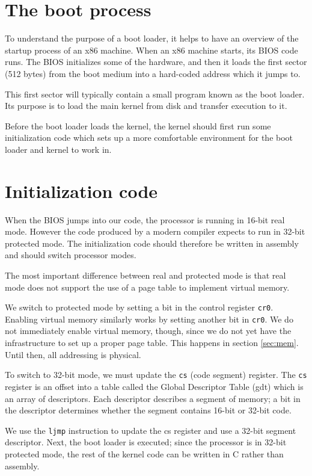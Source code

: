 \documentclass{report}
\begin{document}
\section{The boot process}
To understand the purpose of a boot loader, it helps to have an overview of
the startup process of an x86 machine.
When an x86 machine starts, its BIOS code runs. The BIOS initializes some of
the hardware, and then it loads the first sector (512 bytes) from the boot
medium into a hard-coded address which it jumps to.

This first sector will typically contain a small program known as the boot
loader. Its purpose is to load the main kernel from disk and transfer
execution to it.

Before the boot loader loads the kernel, the kernel should first run some
initialization code which sets up a more comfortable environment for the boot
loader and kernel to work in.


\section{Initialization code}
When the BIOS jumps into our code, the processor is running in 16-bit real
mode. However the code produced by a modern compiler expects to run in 32-bit
protected mode. The initialization code should therefore be written in
assembly and should switch processor modes.

The most important difference between real and protected mode is that real
mode does not support the use of a page table to implement virtual memory.

We switch to protected mode by setting a bit in the control register
\texttt{cr0}. Enabling virtual memory similarly works by setting another bit
in \texttt{cr0}. We do not immediately enable virtual memory, though, since we
do not yet have the infrastructure to set up a proper page table. This happens
in section \ref{sec:mem}. Until then, all addressing is physical.

To switch to 32-bit mode, we must update the \texttt{cs} (code segment)
register. The \texttt{cs} register is an offset into a table called the Global
Descriptor Table (\gls{gdt}) which is an array of descriptors. Each descriptor
describes a segment of memory; a bit in the descriptor determines whether the
segment contains 16-bit or 32-bit code. 

We use the \texttt{ljmp} instruction to update the \gls{cs} register and use a
32-bit segment descriptor. Next, the boot loader is executed; since the
processor is in 32-bit protected mode, the rest of the kernel code can be
written in C rather than assembly.
\end{document}
